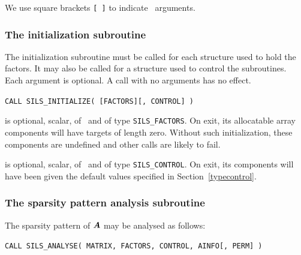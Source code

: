 \documentclass{galahad}
\newcommand{\packagename}{SILS}
\begin{document}

\galarguments
We use square brackets {\tt [ ]} to indicate \optional\ arguments.


\subsubsection{The initialization subroutine}\label{subinit}
The initialization subroutine must be called for each structure used 
to hold the factors. It may also be called for a structure used to 
control the subroutines. Each argument is optional. A call with no 
arguments has no effect. 

\hskip0.5in 
{\tt CALL \packagename\_INITIALIZE( [FACTORS][, CONTROL] )}

\begin{description}

 is optional, scalar, of \intentout\ and of type 
{\tt \packagename\_FACTORS}. On exit, its allocatable array components will have 
targets of length zero.  Without such initialization, these components 
are undefined and other calls are likely to fail. 
 
 is optional, scalar, of \intentout\ and of type 
{\tt \packagename\_CONTROL}. On exit, its components will have been 
given the default values specified in Section~\ref{typecontrol}. 

\end{description}


\subsubsection{The sparsity pattern analysis subroutine}
The sparsity pattern of ${\bm{A}}$ may be analysed as follows:

\hskip0.5in 
{\tt CALL \packagename\_ANALYSE( MATRIX, FACTORS, CONTROL, AINFO[, PERM] )}
\end{document}
